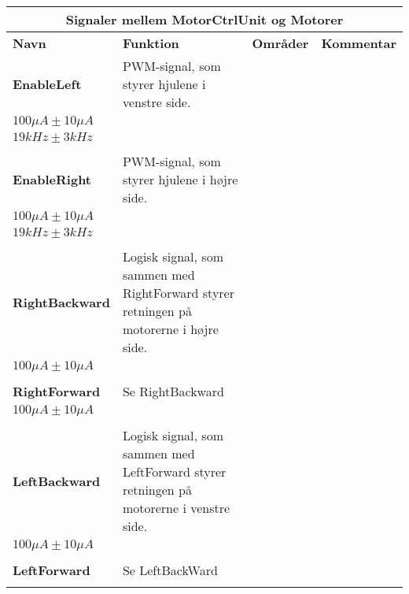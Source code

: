\begin{longtable}{ p{} p{} p{} p{} }
		\hline
		\multicolumn{4}{c}{\textbf{Signaler mellem MotorCtrlUnit og Motorer}} \\\hline
		\multicolumn{1}{l}{\textbf{Navn}} & \textbf{Funktion} & \textbf{Områder} &\multicolumn{1}{l}{\textbf{Kommentar}}  \\\hline
		\textbf{EnableLeft} & PWM-signal, som styrer hjulene i venstre side. & 
		\begin{tabular}{l}
		 $ 0-5 V \pm 0.5 V$\\
		 $ 100 \mu A \pm 10 \mu A $\\ 
		 $ 19 kHz \pm 3 kHz$\\
		\end{tabular} & \phantom{} \\\hdashline
		\textbf{EnableRight} & PWM-signal, som styrer hjulene i højre side. & 
		\begin{tabular}{l}
		 $ 0-5 V \pm 0.5 V$\\
		 $ 100 \mu A \pm 10 \mu A $\\ 
		 $ 19 kHz \pm 3 kHz$\\
		\end{tabular}
		& \phantom{} \\\hdashline
		\textbf{RightBackward} & Logisk signal, som sammen med RightForward styrer retningen på motorerne i højre side. & 
		\begin{tabular}{l}
		$ 0-5 V \pm 0.5 V $ \\
		$ 100 \mu A \pm 10 \mu A $\\ 
		\end{tabular} & \phantom{}  \\\hdashline
		\textbf{RightForward} & Se RightBackward & 
		\begin{tabular}{l}
		$ 0-5 V \pm 0.5 V $ \\
		$ 100 \mu A \pm 10 \mu A $\\ 
		\end{tabular} & \phantom{}  \\\hdashline
		\textbf{LeftBackward} & Logisk signal, som sammen med LeftForward styrer retningen på motorerne i venstre side. & 
		\begin{tabular}{l}
		$ 0-5 V \pm 0.5 V $\\
		$ 100 \mu A \pm 10 \mu A $\\
		\end{tabular}& \phantom{}  \\\hdashline
		\textbf{LeftForward} & Se LeftBackWard & 
		\begin{tabular}{l}
		$ 0-5 V \pm 0.5 V $\\

\end{tabular}
\end{longtable}

